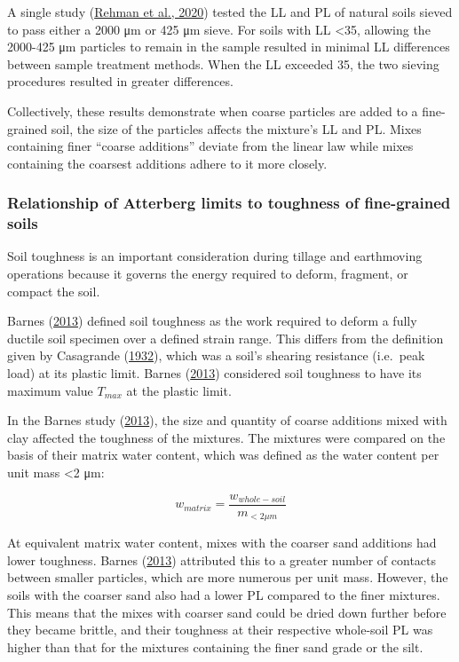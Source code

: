 \documentclass[
  letterpaper,
]{article}
\begin{document}
A single study (\protect\hyperlink{ref-Rehman2020}{Rehman et al., 2020}) tested the LL and PL of natural soils sieved to pass either a 2000 μm or 425 μm sieve.
For soils with LL \textless35, allowing the 2000-425 μm particles to remain in the sample resulted in minimal LL differences between sample treatment methods.
When the LL exceeded 35, the two sieving procedures resulted in greater differences.

Collectively, these results demonstrate when coarse particles are added to a fine-grained soil, the size of the particles affects the mixture's LL and PL.
Mixes containing finer ``coarse additions'' deviate from the linear law while mixes containing the coarsest additions adhere to it more closely.

\hypertarget{relationship-of-atterberg-limits-to-toughness-of-fine-grained-soils}{%
\subsubsection{Relationship of Atterberg limits to toughness of fine-grained soils}\label{relationship-of-atterberg-limits-to-toughness-of-fine-grained-soils}}

Soil toughness is an important consideration during tillage and earthmoving operations because it governs the energy required to deform, fragment, or compact the soil.

Barnes (\protect\hyperlink{ref-Barnes2013}{2013}) defined soil toughness as the work required to deform a fully ductile soil specimen over a defined strain range.
This differs from the definition given by Casagrande (\protect\hyperlink{ref-Casagrande1932}{1932}), which was a soil's shearing resistance (i.e.~peak load) at its plastic limit.
Barnes (\protect\hyperlink{ref-Barnes2013}{2013}) considered soil toughness to have its maximum value \(T_{max}\) at the plastic limit.

In the Barnes study (\protect\hyperlink{ref-Barnes2013}{2013}), the size and quantity of coarse additions mixed with clay affected the toughness of the mixtures.
The mixtures were compared on the basis of their matrix water content, which was defined as the water content per unit mass \textless2 μm:

\begin{equation}
w_{matrix} = \frac{w_{whole-soil}}{m_{<2\mu m}}
\label{eq:barnes-matrix-water-content}
\end{equation}

At equivalent matrix water content, mixes with the coarser sand additions had lower toughness.
Barnes (\protect\hyperlink{ref-Barnes2013}{2013}) attributed this to a greater number of contacts between smaller particles, which are more numerous per unit mass.
However, the soils with the coarser sand also had a lower PL compared to the finer mixtures.
This means that the mixes with coarser sand could be dried down further before they became brittle, and their toughness at their respective whole-soil PL was higher than that for the mixtures containing the finer sand grade or the silt.
\end{document}
